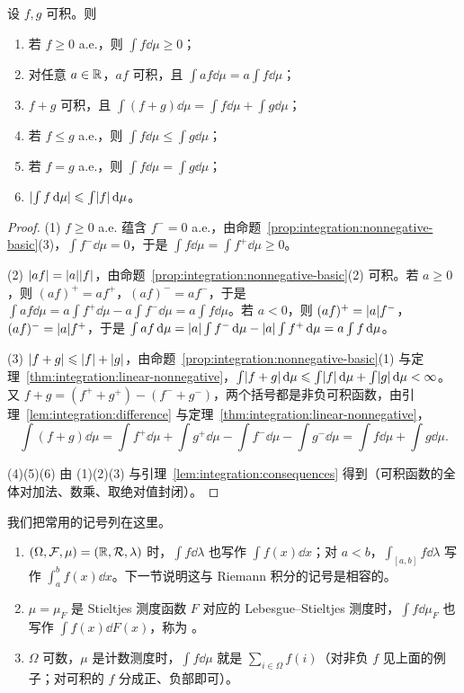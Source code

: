 \begin{theorem}\label{thm:integration:integrable}
设 $f,g$ 可积。则
\begin{enumerate}
\item 若 $f\geqslant0$ a.e.，则 $\int f\dd\mu\geqslant0$；
\item 对任意 $a\in\mathbb{R}$，$af$ 可积，且 $\int af\dd\mu=a\int f\dd\mu$；
\item $f+g$ 可积，且 $\int(f+g)\dd\mu=\int f\dd\mu+\int g\dd\mu$；
\item 若 $f\leqslant g$ a.e.，则 $\int f\dd\mu\leqslant\int g\dd\mu$；
\item 若 $f=g$ a.e.，则 $\int f\dd\mu=\int g\dd\mu$；
\item $\lvert \int f\,\mathrm{d}\mu\rvert\leqslant\int\lvert f\rvert\,\mathrm{d}\mu$。
\end{enumerate}
\end{theorem}
\begin{proof}
(1) $f\geqslant0$ a.e. 蕴含 $f^-=0$ a.e.，由命题~\ref{prop:integration:nonnegative-basic}(3)，$\int f^-\dd\mu=0$，于是 $\int f\dd\mu=\int f^+\dd\mu\geqslant0$。

(2) $\lvert af\rvert=\lvert a\rvert\lvert f\rvert$，由命题~\ref{prop:integration:nonnegative-basic}(2) 可积。若 $a\geqslant0$，则 $(af)^+=af^+$，$(af)^-=af^-$，于是 $\int af\dd\mu=a\int f^+\dd\mu-a\int f^-\dd\mu=a\int f\dd\mu$。若 $a<0$，则 $(af)^+=\lvert a\rvert f^-$，$(af)^-=\lvert a\rvert f^+$，于是 $\int af\,\mathrm{d}\mu=\lvert a\rvert\int f^-\,\mathrm{d}\mu-\lvert a\rvert\int f^+\,\mathrm{d}\mu=a\int f\,\mathrm{d}\mu$。

(3) $\lvert f+g\rvert\leqslant\lvert f\rvert+\lvert g\rvert$，由命题~\ref{prop:integration:nonnegative-basic}(1) 与定理~\ref{thm:integration:linear-nonnegative}，$\int\lvert f+g\rvert\,\mathrm{d}\mu\leqslant\int\lvert f\rvert\,\mathrm{d}\mu+\int\lvert g\rvert\,\mathrm{d}\mu<\infty$。又 $f+g=(f^++g^+)-(f^-+g^-)$，两个括号都是非负可积函数，由引理~\ref{lem:integration:difference} 与定理~\ref{thm:integration:linear-nonnegative}，
\[
\int(f+g)\dd\mu=\int f^+\dd\mu+\int g^+\dd\mu-\int f^-\dd\mu-\int g^-\dd\mu=\int f\dd\mu+\int g\dd\mu .
\]

(4)(5)(6) 由 (1)(2)(3) 与引理~\ref{lem:integration:consequences} 得到（可积函数的全体对加法、数乘、取绝对值封闭）。
\end{proof}

我们把常用的记号列在这里。
\begin{enumerate}
\item $(\Omega,\mathcal{F},\mu)=(\mathbb{R},\mathcal{R},\lambda)$ 时，$\int f\dd\lambda$ 也写作 $\int f(x)\dd x$；对 $a<b$，$\int_{[a,b]}f\dd\lambda$ 写作 $\int_a^bf(x)\dd x$。下一节说明这与 Riemann 积分的记号是相容的。
\item $\mu=\mu_F$ 是 Stieltjes 测度函数 $F$ 对应的 Lebesgue--Stieltjes 测度时，$\int f\dd\mu_F$ 也写作 $\int f(x)\dd F(x)$，称为 。
\item $\Omega$ 可数，$\mu$ 是计数测度时，$\int f\dd\mu$ 就是 $\sum_{i\in\Omega}f(i)$（对非负 $f$ 见上面的例子；对可积的 $f$ 分成正、负部即可）。
\end{enumerate}

